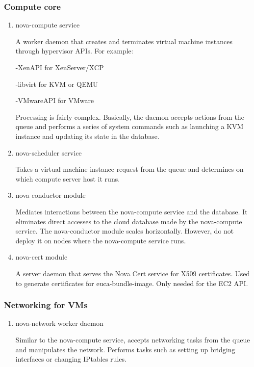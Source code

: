     \subsubsection{Compute core}
        \begin{enumerate}
            \item nova-compute service
            \par A worker daemon that creates and terminates virtual machine instances through hypervisor APIs. For example:

            \par -XenAPI for XenServer/XCP

            \par -libvirt for KVM or QEMU

            \par -VMwareAPI for VMware

            \par Processing is fairly complex. Basically, the daemon accepts actions from the queue and performs a series of system commands such as launching a KVM instance and updating its state in the database.

            \item nova-scheduler service
            \par Takes a virtual machine instance request from the queue and determines on which compute server host it runs.

            \item nova-conductor module
            \par Mediates interactions between the nova-compute service and the database. It eliminates direct accesses to the cloud database made by the nova-compute service. The nova-conductor module scales horizontally. However, do not deploy it on nodes where the nova-compute service runs. 
            
            \item nova-cert module
            \par A server daemon that serves the Nova Cert service for X509 certificates. Used to generate certificates for euca-bundle-image. Only needed for the EC2 API.
            
        \end{enumerate}
    \subsubsection{Networking for VMs}
        \begin{enumerate}
            \item nova-network worker daemon
            \par Similar to the nova-compute service, accepts networking tasks from the queue and manipulates the network. Performs tasks such as setting up bridging interfaces or changing IPtables rules.
        \end{enumerate}
